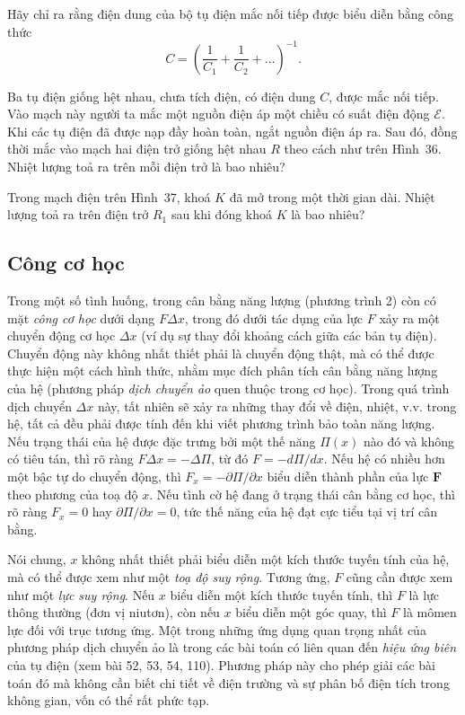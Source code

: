 
 Hãy chỉ ra rằng điện dung của bộ tụ điện mắc nối tiếp được biểu diễn bằng công thức
\[
C = \left(\frac{1}{C_1}+\frac{1}{C_2}+\dots\right)^{-1}.
\]

 Ba tụ điện giống hệt nhau, chưa tích điện, có điện dung $C$, được mắc nối tiếp. Vào mạch này người ta mắc một nguồn điện áp một chiều có suất điện động $\mathcal{E}$. Khi các tụ điện đã được nạp đầy hoàn toàn, ngắt nguồn điện áp ra. Sau đó, đồng thời mắc vào mạch hai điện trở giống hệt nhau $R$ theo cách như trên Hình~36. Nhiệt lượng toả ra trên mỗi điện trở là bao nhiêu?


 Trong mạch điện trên Hình~37, khoá $K$ đã mở trong một thời gian dài. Nhiệt lượng toả ra trên điện trở $R_1$ sau khi đóng khoá $K$ là bao nhiêu? 

\subsection{Công cơ học}

Trong một số tình huống, trong cân bằng năng lượng (phương trình 2) còn có mặt \emph{công cơ học} dưới dạng $F\Delta x$, trong đó dưới tác dụng của lực $F$ xảy ra một chuyển động cơ học $\Delta x$ (ví dụ sự thay đổi khoảng cách giữa các bản tụ điện). Chuyển động này không nhất thiết phải là chuyển động thật, mà có thể được thực hiện một cách hình thức, nhằm mục đích phân tích cân bằng năng lượng của hệ (phương pháp \emph{dịch chuyển ảo} quen thuộc trong cơ học). Trong quá trình dịch chuyển $\Delta x$ này, tất nhiên sẽ xảy ra những thay đổi về điện, nhiệt, v.v. trong hệ, tất cả đều phải được tính đến khi viết phương trình bảo toàn năng lượng. Nếu trạng thái của hệ được đặc trưng bởi một thế năng $\Pi(x)$ nào đó và không có tiêu tán, thì rõ ràng $F\Delta x = -\Delta\Pi$, từ đó $F = -d\Pi/dx$. Nếu hệ có nhiều hơn một bậc tự do chuyển động, thì $F_x = -\partial\Pi/\partial x$ biểu diễn thành phần của lực $\mathbf{F}$ theo phương của toạ độ $x$. Nếu tình cờ hệ đang ở trạng thái cân bằng cơ học, thì rõ ràng $F_x = 0$ hay $\partial\Pi/\partial x = 0$, tức thế năng của hệ đạt cực tiểu tại vị trí cân bằng.

Nói chung, $x$ không nhất thiết phải biểu diễn một kích thước tuyến tính của hệ, mà có thể được xem như một \emph{toạ độ suy rộng}. Tương ứng, $F$ cũng cần được xem như một \emph{lực suy rộng}. Nếu $x$ biểu diễn một kích thước tuyến tính, thì $F$ là lực thông thường (đơn vị niutơn), còn nếu $x$ biểu diễn một góc quay, thì $F$ là mômen lực đối với trục tương ứng. Một trong những ứng dụng quan trọng nhất của phương pháp dịch chuyển ảo là trong các bài toán có liên quan đến \emph{hiệu ứng biên} của tụ điện (xem bài 52, 53, 54, 110). Phương pháp này cho phép giải các bài toán đó mà không cần biết chi tiết về điện trường và sự phân bố điện tích trong không gian, vốn có thể rất phức tạp.

